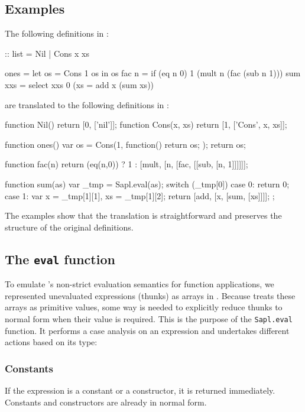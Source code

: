 \subsection{Examples}
The following definitions in \Sapl:
\begin{CleanCode}
:: list = Nil | Cons x xs	

ones = let os = Cons 1 os in os
fac n = if (eq n 0) 1 (mult n (fac (sub n 1)))
sum xxs = select xxs 0 (\x xs = add x (sum xs))
\end{CleanCode}
%
are translated to the following definitions in \JS:
\begin{CleanCode}
function Nil() { return [0, ['nil']]; }
function Cons(x, xs) { return [1, ['Cons', x, xs]]; }

function ones() { var os = Cons(1, function() { return os; }); return os; }

function fac(n) {
    return (eq(n,0)) ? 1 : [mult, [n, [fac, [[sub, [n, 1]]]]]];
}

function sum(as) {
	var _tmp = Sapl.eval(as);
	switch (_tmp[0]) {
		case 0: return 0;
		case 1: var x = _tmp[1][1], xs = _tmp[1][2]; 
				return [add, [x, [sum, [xs]]]];
	};
}

\end{CleanCode}
The examples show that the translation is straightforward and preserves the
structure of the original definitions.

\subsection{The \texttt{eval} function}
\label{eval}
To emulate \Sapl's non-strict evaluation semantics for function applications, 
we represented unevaluated expressions (thunks) as arrays in \JS. Because \JS
treats these arrays as primitive values, some way is needed to explicitly reduce
thunks to normal form when their value is required. This is the purpose of the
\texttt{Sapl.eval} function. It performs a case analysis on an expression and
undertakes different actions based on its type:

\vspace{-0.5cm}
\subsubsection{Constants}
If the expression is a constant or a constructor, it is returned immediately. 
Constants and constructors are already in normal form.

